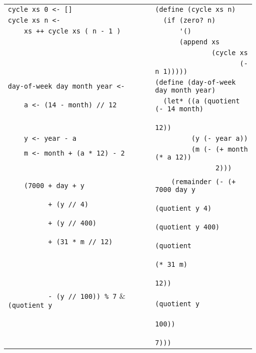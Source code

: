 \begin{table}[ht!]
\begin{tabular}{|l|l|}
            \verb,cycle xs 0 <- [],            & \verb,(define (cycle xs n), \\
            \verb,cycle xs n <- ,              & \verb,  (if (zero? n),\\
            \verb,    xs ++ cycle xs ( n - 1 ),& \verb,      '(), \\
                                               & \verb,      (append xs, \\
                                               & \verb,              (cycle xs, \\
                                               & \verb,                     (- n 1))))), \\ \hline
            
            \verb,day-of-week day month year <-,& \verb,(define (day-of-week day month year), \\
            \verb,    a <- (14 - month) // 12,  & \verb,  (let* ((a (quotient (- 14 month),\\
                                                & \verb,                      12)),\\
            \verb,    y <- year - a,            & \verb,         (y (- year a)), \\
            \verb,    m <- month + (a * 12) - 2,& \verb,         (m (- (+ month (* a 12)),\\
                                                & \verb,               2))), \\
                                                & \\
            \verb,    (7000 + day + y,          & \verb,    (remainder (- (+ 7000 day y, \\
            \verb,          + (y // 4),         & \verb,                     (quotient y 4), \\
            \verb,          + (y // 400),       & \verb,                     (quotient y 400),\\
            \verb,          + (31 * m // 12),   & \verb,                     (quotient, \\
                                                & \verb,                        (* 31 m),\\
                                                & \verb,                        12)),\\
            \verb,          - (y // 100)) % 7,  & \verb,                     (quotient y,\\
                                                & \verb,                               100)), \\
                                                & \verb,                     7))), \\ \hline
        \end{tabular}
    \end{table}
    \clearpage
